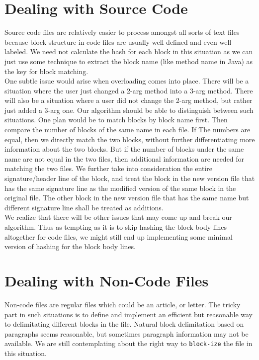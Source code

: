 \documentclass{article}
\begin{document}
\section{Dealing with Source Code}
Source code files are relatively easier to process amongst all sorts of text files because block structure in code files are usually well defined and even well labeled. We need not calculate the hash for each block in this situation as we can just use some technique to extract the block name (like method name in Java) as the key for block matching.\\

One subtle issue would arise when overloading comes into place. There will be a situation where the user just changed a 2-arg method into a 3-arg method. There will also be a situation where a user did not change the 2-arg method, but rather just added a 3-arg one. Our algorithm should be able to distinguish between such situations. One plan would be to match blocks by block name first. Then compare the number of blocks of the same name in each file. If The numbers are equal, then we directly match the two blocks, without further differentiating more information about the two blocks. But if the number of blocks under the same name are not equal in the two files, then additional information are needed for matching the two files. We further take into consideration the entire signature/header line of the block, and treat the block in the new version file that has the same signature line as the modified version of the same block in the original file. The other block in the new version file that has the same name but different signature line shall be treated as additions.\\

We realize that there will be other issues that may come up and break our algorithm. Thus as tempting as it is to skip hashing the block body lines altogether for code files, we might still end up implementing some minimal version of hashing for the block body lines. 

\section{Dealing with Non-Code Files}
Non-code files are regular files which could be an article, or letter. The tricky part in such situations is to define and implement an efficient but reasonable way to delimitating different blocks in the file. Natural block delimitation based on paragraphs seems reasonable, but sometimes paragraph information may not be available. We are still contemplating about the right way to \texttt{block-ize} the file in this situation.\\
\end{document}
